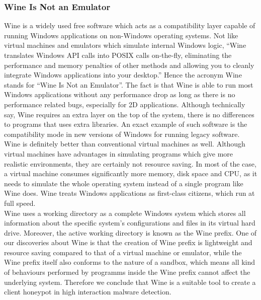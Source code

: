 \subsubsection{Wine Is Not an Emulator}
Wine is a widely used free software which acts as a compatibility layer 
capable of running Windows applications on non-Windows operating 
systems.\cite{wikiwine} Not like virtual machines and emulators which simulate 
internal Windows logic, ``Wine translates Windows API calls into POSIX calls 
on-the-fly, eliminating the performance and memory penalties of other methods 
and allowing you to cleanly integrate Windows applications into your 
desktop.''\cite{aboutwine} Hence the acronym Wine stands for ``Wine Is Not an 
Emulator''. The fact is that Wine is able to run most Windows applications 
without any performance drop as long as there is no performance related bugs, 
especially for 2D applications. Although technically say, Wine requires an 
extra layer on the top of the system, there is no differences to programs that 
uses extra libraries. An exact example of such software is the compatibility 
mode in new versions of Windows for running legacy 
software.\cite{wineperformance} \\
Wine is definitely better than conventional virtual machines as well. Although 
virtual machines have advantages in simulating programs which give more 
realistic environments, they are certainly not resource saving. In most of the 
case, a virtual machine consumes significantly more memory, disk space and 
CPU, as it needs to simulate the whole operating system instead of a single 
program like Wine does. Wine treats Windows applications as first-class 
citizens, which run at full speed.\cite{wineperformance} \\
Wine uses a working directory as a complete Windows system which stores all 
information about the specific system's configurations and files in its virtual 
hard drive. Moreover, the active working directory is known as the Wine prefix. 
One of our discoveries about Wine is that the creation of Wine prefix is 
lightweight and resource saving compared to that of a virtual machine or
emulator, while the Wine prefix itself also conforms to the nature of a 
sandbox, which means all kind of behaviours performed by programms inside the 
Wine prefix cannot affect the underlying system. Therefore we conclude that 
Wine is a suitable tool to create a client honeypot in high interaction 
malware detection. \\

